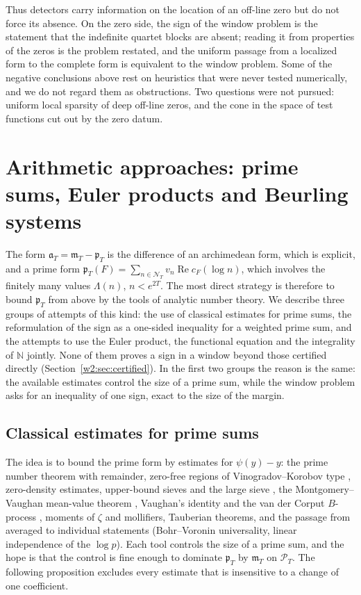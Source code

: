 \documentclass[11pt]{amsart}
\theoremstyle{definition}
\theoremstyle{remark}
\numberwithin{equation}{section}
\newcommand{\N}{\mathbb{N}}
\DeclareMathOperator{\Rel}{Re}
\newcommand{\cF}{c_F}                                  %
\newcommand{\PT}{\mathcal{P}_T}                        %
\newcommand{\NT}{\mathcal{N}_T}                        %
\newcommand{\mT}{\mathfrak{m}_T}                       %
\newcommand{\pT}{\mathfrak{p}_T}                       %
\newcommand{\aT}{\mathfrak{a}_T}                       %
\begin{document}
Thus detectors carry information on the location of an off-line zero but do not force its
absence. On the zero side, the sign of the window problem is the statement that the indefinite
quartet blocks are absent; reading it from properties of the zeros is the problem restated, and the
uniform passage from a localized form to the complete form is equivalent to the window problem.
Some of the negative conclusions above rest on heuristics that were never tested numerically, and
we do not regard them as obstructions. Two questions were not pursued: uniform local sparsity of
deep off-line zeros, and the cone in the space of test functions cut out by the zero datum.

\section{Arithmetic approaches: prime sums, Euler products and Beurling systems}\label{w7:sec:primeside}

The form $\aT=\mT-\pT$ is the difference of an archimedean form, which is explicit, and a prime form
$\pT(F)=\sum_{n\in\NT}v_n\Rel\cF(\log n)$, which involves the finitely many values $\Lambda(n)$, $n<e^{2T}$. The
most direct strategy is therefore to bound $\pT$ from above by the tools of analytic number theory. We describe
three groups of attempts of this kind: the use of classical estimates for prime sums, the reformulation of the
sign as a one-sided inequality for a weighted prime sum, and the attempts to use the Euler product, the
functional equation and the integrality of $\N$ jointly. None of them proves a sign in a window beyond those
certified directly (Section~\ref{w2:sec:certified}). In the first two groups the reason is the same: the
available estimates control the size of a prime sum, while the window problem asks for an inequality of one
sign, exact to the size of the margin.

\subsection{Classical estimates for prime sums}\label{w7:fam:R17}

The idea is to bound the prime form by estimates for $\psi(y)-y$: the prime number theorem with remainder,
zero-free regions of Vinogradov--Korobov type \cite{Ford2002}, zero-density estimates, upper-bound sieves and
the large sieve \cite{MontgomeryVaughan1973}, the Montgomery--Vaughan mean-value theorem
\cite{MontgomeryVaughan1974}, Vaughan's identity and the van der Corput $B$-process \cite{Vaughan1977}, moments
of $\zeta$ and mollifiers, Tauberian theorems, and the passage from averaged to individual statements
(Bohr--Voronin universality, linear independence of the $\log p$). Each tool controls the size of a prime sum,
and the hope is that the control is fine enough to dominate $\pT$ by $\mT$ on $\PT$. The following proposition
excludes every estimate that is insensitive to a change of one coefficient.
\end{document}
